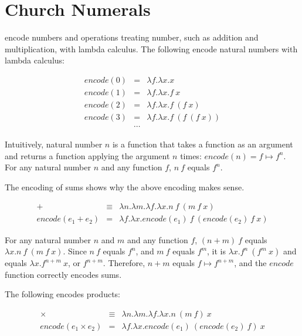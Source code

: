 \section{Church Numerals}

 encode numbers and operations treating number, such as
addition and multiplication, with lambda calculus. The following encode natural
numbers with lambda calculus:

\[
\begin{array}{rcl}
\mathit{encode}(0)&=&\lambda f.\lambda x.x \\
\mathit{encode}(1)&=&\lambda f.\lambda x.f\ x \\
\mathit{encode}(2)&=&\lambda f.\lambda x.f\ (f\ x) \\
\mathit{encode}(3)&=&\lambda f.\lambda x.f\ (f\ (f\ x)) \\
&\cdots&
\end{array}
\]

Intuitively, natural number \(n\) is a function that takes a function as an
argument and returns a function applying the argument \(n\) times:
\(\mathit{encode}(n)=f\mapsto f^n\). For any natural number \(n\) and any
function \(f\), \(n\ f\) equals \(f^n\).

The encoding of sums shows why the above encoding makes sense.

\[
\begin{array}{rcl}
+&\equiv&\lambda n.\lambda m.\lambda f.\lambda x.n\ f\ (m\ f\ x) \\
\mathit{encode}(e_1+e_2)&=&\lambda f.\lambda x.\mathit{encode}(e_1)\ f\
(\mathit{encode}(e_2)\ f\ x)
\end{array}
\]

For any natural number \(n\) and \(m\) and any function \(f\), \( (n+m)\ f\)
equals \(\lambda x.n\ f\ (m\ f\ x)\). Since \(n\ f\) equals \(f^n\), and \(m\ f\)
equals \(f^m\), it is \(\lambda x.f^n\ (f^m\ x)\) and equals \(\lambda x.f^{n+m}\
x\), or \(f^{n+m}\). Therefore, \(n+m\) equals \(f\mapsto f^{n+m}\), and the
\(\mathit{encode}\) function correctly encodes sums.

The following encodes products:

\[
\begin{array}{rcl}
\times&\equiv&\lambda n.\lambda m.\lambda f.\lambda x.n\ (m\ f)\ x \\
\mathit{encode}(e_1\times e_2)&=&\lambda f.\lambda x.\mathit{encode}(e_1)\
(\mathit{encode}(e_2)\ f)\ x
\end{array}
\]

